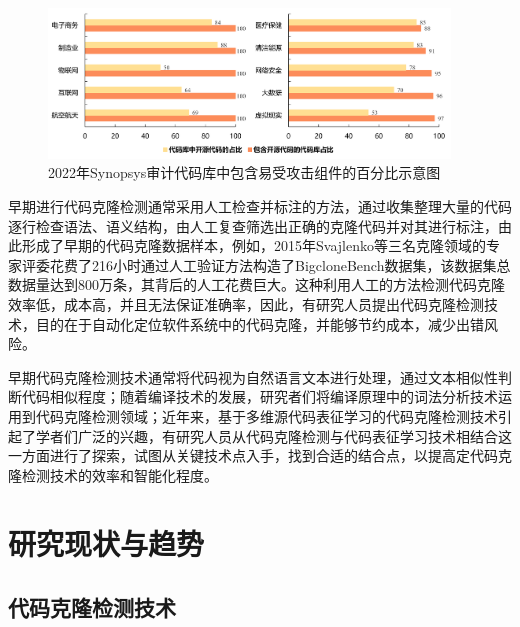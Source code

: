\begin{figure}[H]
    \centering
    \includegraphics[width=0.95\textwidth]{figures/assembly}
    \caption{2022年Synopsys审计代码库中包含易受攻击组件的百分比示意图}
    \label{fig:assembly}
\end{figure}

早期进行代码克隆检测通常采用人工检查并标注的方法，通过收集整理大量的代码逐行检查语法、语义结构，由人工复查筛选出正确的克隆代码并对其进行标注，由此形成了早期的代码克隆数据样本，例如，2015年Svajlenko\cite{7332459}等三名克隆领域的专家评委花费了216小时通过人工验证方法构造了BigcloneBench数据集，该数据集总数据量达到800万条，其背后的人工花费巨大。这种利用人工的方法检测代码克隆效率低，成本高，并且无法保证准确率\cite{7965429}，因此，有研究人员提出代码克隆检测技术，目的在于自动化定位软件系统中的代码克隆，并能够节约成本，减少出错风险\cite{Yang2015ClassificationMF}。

早期代码克隆检测技术通常将代码视为自然语言文本进行处理，通过文本相似性判断代码相似程度；随着编译技术的发展，研究者们将编译原理中的词法分析技术运用到代码克隆检测领域\cite{zhang2023survey}；近年来，基于多维源代码表征学习的代码克隆检测技术引起了学者们广泛的兴趣，有研究人员从代码克隆检测与代码表征学习技术相结合这一方面进行了探索，试图从关键技术点入手，找到合适的结合点，以提高定代码克隆检测技术的效率和智能化程度。


\section{研究现状与趋势}
\label{sec:status}

\subsection{代码克隆检测技术}
\label{subsec:Code clone detection}

